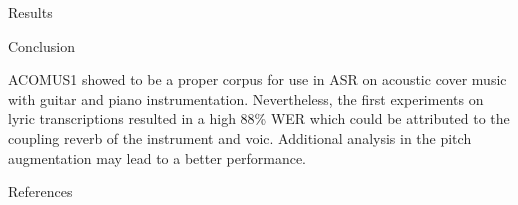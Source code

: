 \documentclass[final]{beamer}
\newlength{\onecolwid}
\begin{document}
\begin{frame}[t]
\begin{columns}[t]
\begin{column}{\onecolwid}
\begin{block}{Results}
    
%     
    

    
\end{block}


\begin{block}{Conclusion}

ACOMUS1 showed to be a proper corpus for use in ASR on acoustic cover music with guitar and piano instrumentation.
Nevertheless, the first experiments on lyric transcriptions resulted in a high 88\% WER which could be attributed to the coupling reverb of the instrument and voic.
Additional analysis in the pitch augmentation may lead to a better performance.

\end{block}






\begin{block}{References}

\nocite{*} %
\small{
 
\vspace{0.75in}}


\end{block}
\end{column}
\end{columns}
\end{frame}
\end{document}
